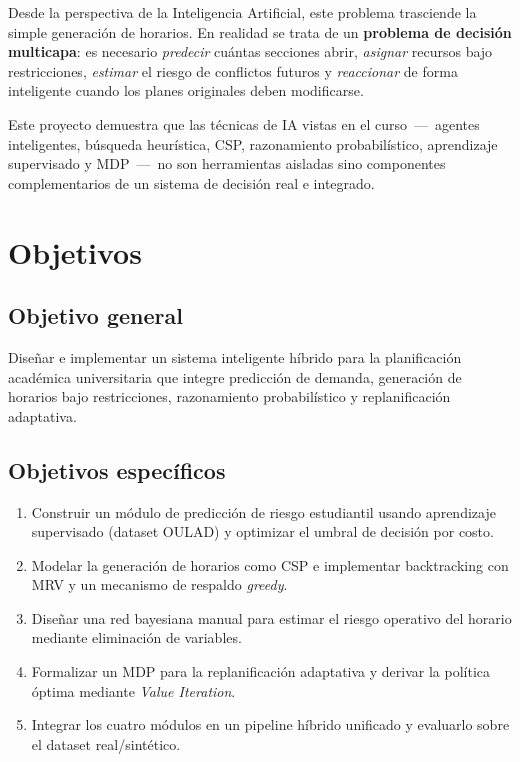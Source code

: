 \documentclass[12pt,twoside]{report}
\theoremstyle{definition}
\begin{document}
Desde la perspectiva de la Inteligencia Artificial, este problema trasciende la
simple generaci\'on de horarios.  En realidad se trata de un \textbf{problema de
decisi\'on multicapa}: es necesario \emph{predecir} cu\'antas secciones abrir,
\emph{asignar} recursos bajo restricciones, \emph{estimar} el riesgo de conflictos
futuros y \emph{reaccionar} de forma inteligente cuando los planes originales deben
modificarse.

\begin{importante}
Este proyecto demuestra que las t\'ecnicas de IA vistas en el curso~---~agentes
inteligentes, b\'usqueda heur\'istica, CSP, razonamiento probabil\'istico, aprendizaje
supervisado y MDP~---~no son herramientas aisladas sino componentes complementarios
de un sistema de decisi\'on real e integrado.
\end{importante}

\section{Objetivos}

\subsection*{Objetivo general}
Dise\~nar e implementar un sistema inteligente h\'ibrido para la planificaci\'on
acad\'emica universitaria que integre predicci\'on de demanda, generaci\'on de
horarios bajo restricciones, razonamiento probabil\'istico y replanificaci\'on
adaptativa.

\subsection*{Objetivos espec\'ificos}
\begin{enumerate}[leftmargin=2em,itemsep=4pt]
  \item Construir un m\'odulo de predicci\'on de riesgo estudiantil usando aprendizaje supervisado (dataset OULAD) y optimizar el umbral de decisi\'on por costo.
  \item Modelar la generaci\'on de horarios como CSP e implementar backtracking con MRV y un mecanismo de respaldo \emph{greedy}.
  \item Dise\~nar una red bayesiana manual para estimar el riesgo operativo del horario mediante eliminaci\'on de variables.
  \item Formalizar un MDP para la replanificaci\'on adaptativa y derivar la pol\'itica \'optima mediante \emph{Value Iteration}.
  \item Integrar los cuatro m\'odulos en un pipeline h\'ibrido unificado y evaluarlo sobre el dataset real/sint\'etico.
\end{enumerate}
\end{document}
